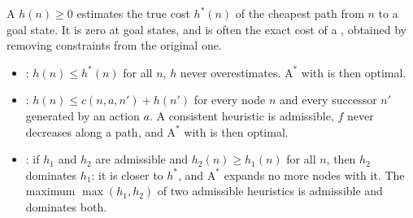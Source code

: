 \documentclass[11pt, a4paper]{exam}
\newcommand{\Astar}{$\text{A}^*$}
\begin{document}
\begin{recap}
    A  $h(n) \geq 0$ estimates the true cost $h^*(n)$ of the cheapest path from $n$ to a goal state. It is zero at goal states, and is often the exact cost of a , obtained by removing constraints from the original one.
    \begin{itemize}
        \item {}: $h(n) \leq h^*(n)$ for all $n$, \ie{} $h$ never overestimates. \Astar{} with  is then optimal.
        \item {}: $h(n) \leq c(n, a, n') + h(n')$ for every node $n$ and every successor $n'$ generated by an action $a$. A consistent heuristic is admissible, $f$ never decreases along a path, and \Astar{} with  is then optimal.
        \item {}: if $h_1$ and $h_2$ are admissible and $h_2(n) \geq h_1(n)$ for all $n$, then $h_2$ dominates $h_1$: it is closer to $h^*$, and \Astar{} expands no more nodes with it. The maximum $\max(h_1, h_2)$ of two admissible heuristics is admissible and dominates both.
    \end{itemize}
\end{recap}
\end{document}
